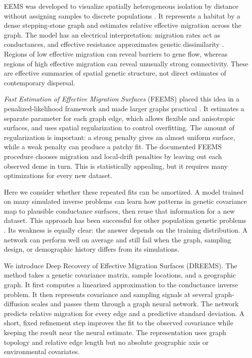 \documentclass[11pt]{article}
\newcommand{\dreems}{DREEMS\xspace}
\newcommand{\feems}{FEEMS\xspace}
\begin{document}
EEMS was developed to visualize spatially heterogeneous isolation by distance
without assigning samples to discrete populations \citep{petkova2016eems}.
It represents a habitat by a dense stepping-stone graph and estimates relative
effective migration across the graph. The model has an electrical
interpretation: migration rates act as conductances, and effective resistance
approximates genetic dissimilarity \citep{mcrae2006resistance}. Regions of low
effective migration can reveal barriers to gene flow, whereas regions of high
effective migration can reveal unusually strong connectivity. These are
effective summaries of spatial genetic structure, not direct estimates of
contemporary dispersal.

\emph{Fast Estimation of Effective Migration Surfaces} (\feems) placed this
idea in a penalized-likelihood framework and made larger graphs practical
\citep{marcus2021feems}. It estimates a separate parameter for each graph edge,
which allows flexible and anisotropic surfaces, and uses spatial regularization
to control overfitting. The amount of regularization is important: a strong
penalty gives an almost uniform surface, while a weak penalty can produce a
patchy fit. The documented \feems procedure chooses migration and local-drift
penalties by leaving out each observed deme in turn. This is statistically
appealing, but it requires many optimizations for every new dataset.

Here we consider whether these repeated fits can be amortized. A model trained
on many simulated inverse problems can learn how patterns in genetic
covariance map to plausible conductance surfaces, then reuse that information
for a new dataset. This approach has been successful for other population
genetic problems \citep{flagel2019cnn,smith2024mapnn}. Its weakness is equally
clear: the answer depends on the training distribution. A network can perform
well on average and still fail when the graph, sampling design, or demographic
history differs from its simulations.

We introduce Deep Recovery of Effective Migration Surfaces
(\dreems). The method takes a genetic covariance matrix, sample locations, and
a geographic graph. It first computes a linearized approximation to the
conductance inverse problem. It then represents covariance and sampling
signals at several graph-diffusion scales and passes them through a graph
neural network. The network predicts relative migration for every edge and a
predictive standard deviation. A short, fixed refinement step improves the fit
to the observed covariance while keeping the result near the neural estimate.
The representation uses graph topology and relative edge length but no
absolute geographic axis or environmental covariates.
\end{document}
